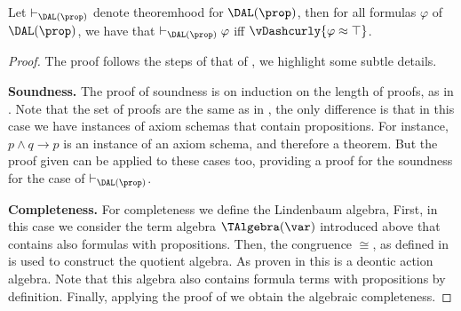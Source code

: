 
%
%


\begin{theorem}\label{prop:completeness:dal:prop} Let  $\vdash_{\DAL(\prop)}$  denote theoremhood for  $\DAL(\prop)$, then for all formulas $\varphi$  of $\DAL(\prop)$,  we have that $\vdash_{\DAL(\prop)} \varphi$ iff $ \vDashcurly {\varphi \approx \top}$.
\end{theorem}
\begin{proof} The proof follows the steps of that of  ,  we highlight some subtle details.  

\medskip 

\noindent\textbf{Soundness.} The proof of soundness is on induction on the length of proofs, as in .  Note that the set of proofs are the same as in , the only difference is that in this case we have instances of axiom schemas that  contain propositions. For instance,  $p \wedge q \rightarrow p$ is an instance of an axiom schema, and therefore a theorem. But the proof given  can be applied to these cases too,  providing a proof for the soundness for the case of $\vdash_{\DAL(\prop)}$.

\medskip

\noindent\textbf{Completeness.} For completeness we define the Lindenbaum algebra, First, in this case we consider the term algebra $\TAlgebra(\var)$ introduced above that contains also formulas with propositions.  Then, the congruence $\cong$, as defined in  is used to construct the quotient algebra. As proven in  this is a deontic action algebra. Note that this algebra also contains formula terms with propositions by definition. Finally, applying the proof of  we obtain the algebraic completeness.
\end{proof}